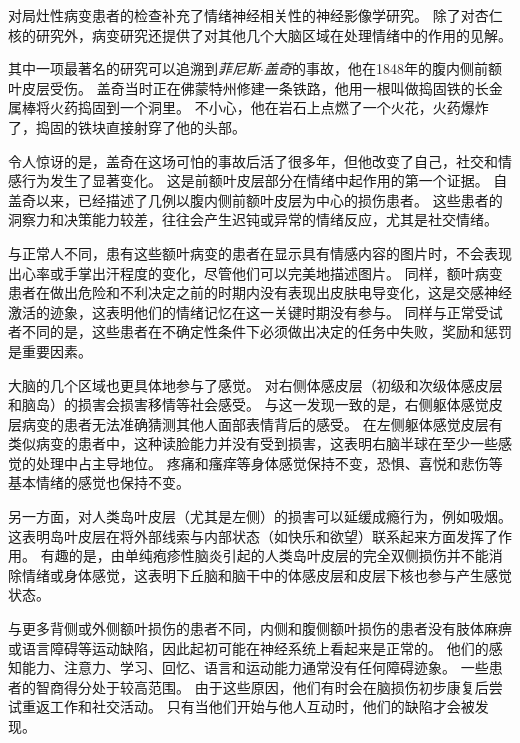 \begin{proposition}[情绪损伤研究] \label{box:42_2}
	
	\quad \quad 对局灶性病变患者的检查补充了情绪神经相关性的神经影像学研究。
	除了对杏仁核的研究外，病变研究还提供了对其他几个大脑区域在处理情绪中的作用的见解。
	
	\quad \quad 其中一项最著名的研究可以追溯到\textit{菲尼斯$\cdot$盖奇}的事故，他在1848年的腹内侧前额叶皮层受伤。
	盖奇当时正在佛蒙特州修建一条铁路，他用一根叫做捣固铁的长金属棒将火药捣固到一个洞里。
	不小心，他在岩石上点燃了一个火花，火药爆炸了，捣固的铁块直接射穿了他的头部。
	
	\quad \quad 令人惊讶的是，盖奇在这场可怕的事故后活了很多年，但他改变了自己，社交和情感行为发生了显著变化。
	这是前额叶皮层部分在情绪中起作用的第一个证据。
	自盖奇以来，已经描述了几例以腹内侧前额叶皮层为中心的损伤患者。
	这些患者的洞察力和决策能力较差，往往会产生迟钝或异常的情绪反应，尤其是社交情绪。
	
	\quad \quad 与正常人不同，患有这些额叶病变的患者在显示具有情感内容的图片时，不会表现出心率或手掌出汗程度的变化，尽管他们可以完美地描述图片。
	同样，额叶病变患者在做出危险和不利决定之前的时期内没有表现出皮肤电导变化，这是交感神经激活的迹象，这表明他们的情绪记忆在这一关键时期没有参与。
	同样与正常受试者不同的是，这些患者在不确定性条件下必须做出决定的任务中失败，奖励和惩罚是重要因素。
	
	\quad \quad 大脑的几个区域也更具体地参与了感觉。
	对右侧体感皮层（初级和次级体感皮层和脑岛）的损害会损害移情等社会感受。
	与这一发现一致的是，右侧躯体感觉皮层病变的患者无法准确猜测其他人面部表情背后的感受。
	在左侧躯体感觉皮层有类似病变的患者中，这种读脸能力并没有受到损害，这表明右脑半球在至少一些感觉的处理中占主导地位。
	疼痛和瘙痒等身体感觉保持不变，恐惧、喜悦和悲伤等基本情绪的感觉也保持不变。
	
	\quad \quad 另一方面，对人类岛叶皮层（尤其是左侧）的损害可以延缓成瘾行为，例如吸烟。
	这表明岛叶皮层在将外部线索与内部状态（如快乐和欲望）联系起来方面发挥了作用。
	有趣的是，由单纯疱疹性脑炎引起的人类岛叶皮层的完全双侧损伤并不能消除情绪或身体感觉，这表明下丘脑和脑干中的体感皮层和皮层下核也参与产生感觉状态。
	
\end{proposition}


与更多背侧或外侧额叶损伤的患者不同，内侧和腹侧额叶损伤的患者没有肢体麻痹或语言障碍等运动缺陷，因此起初可能在神经系统上看起来是正常的。
他们的感知能力、注意力、学习、回忆、语言和运动能力通常没有任何障碍迹象。
一些患者的智商得分处于较高范围。
由于这些原因，他们有时会在脑损伤初步康复后尝试重返工作和社交活动。
只有当他们开始与他人互动时，他们的缺陷才会被发现。


